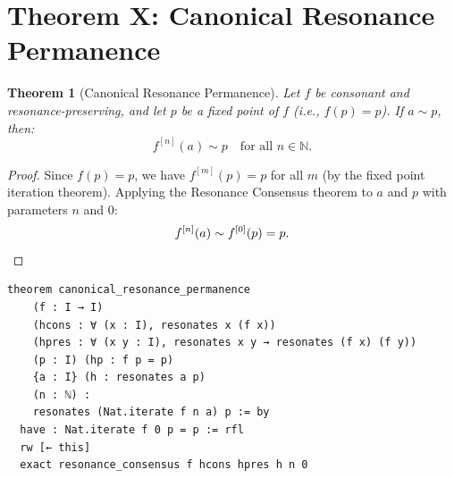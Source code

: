 \documentclass[11pt,openany]{book}
\theoremstyle{definition}
\theoremstyle{plain}
\newtheorem{theorem}[axiom]{Theorem}
\theoremstyle{remark}
\newcommand{\res}{\sim}                      %
\begin{document}
\section{Theorem X: Canonical Resonance Permanence}

\begin{theorem}[Canonical Resonance Permanence]
\label{thm:key-canonical}
Let $f$ be consonant and resonance-preserving, and let $p$ be a fixed point of $f$ (i.e., $f(p) = p$). If $a \res p$, then:
\[
f^{[n]}(a) \res p \quad \text{for all } n \in \mathbb{N}.
\]
\end{theorem}

\begin{proof}
Since $f(p) = p$, we have $f^{[m]}(p) = p$ for all $m$ (by the fixed point iteration theorem). Applying the Resonance Consensus theorem to $a$ and $p$ with parameters $n$ and $0$:
\[
f^{[n]}(a) \res f^{[0]}(p) = p. \qedhere
\]
\end{proof}

\begin{lstlisting}
theorem canonical_resonance_permanence
    (f : I → I)
    (hcons : ∀ (x : I), resonates x (f x))
    (hpres : ∀ (x y : I), resonates x y → resonates (f x) (f y))
    (p : I) (hp : f p = p)
    {a : I} (h : resonates a p)
    (n : ℕ) :
    resonates (Nat.iterate f n a) p := by
  have : Nat.iterate f 0 p = p := rfl
  rw [← this]
  exact resonance_consensus f hcons hpres h n 0
\end{lstlisting}
\end{document}
